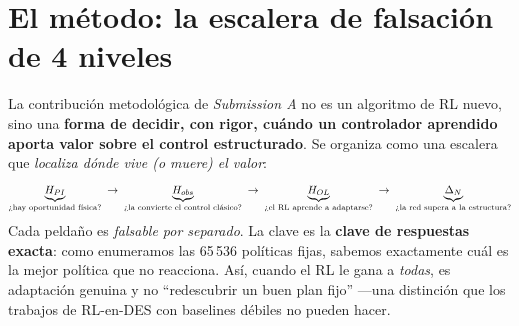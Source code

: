 \documentclass[11pt,a4paper]{article}
\begin{document}
\section{El método: la escalera de falsación de 4 niveles}\label{sec:metodo}
La contribución metodológica de \emph{Submission A} no es un algoritmo de RL nuevo, sino una
\textbf{forma de decidir, con rigor, cuándo un controlador aprendido aporta valor sobre el control
estructurado}. Se organiza como una escalera que \emph{localiza dónde vive (o muere) el valor}:
\[
\underbrace{H_{PI}}_{\text{\textquestiondown{}hay oportunidad física?}}
\;\to\;
\underbrace{H_{obs}}_{\text{\textquestiondown{}la convierte el control clásico?}}
\;\to\;
\underbrace{H_{OL}}_{\text{\textquestiondown{}el RL aprende a adaptarse?}}
\;\to\;
\underbrace{\Delta_N}_{\text{\textquestiondown{}la red supera a la estructura?}}
\]
Cada peldaño es \emph{falsable por separado}. La clave es la \textbf{clave de respuestas exacta}: como
enumeramos las 65\,536 políticas fijas, sabemos exactamente cuál es la mejor política que no reacciona.
Así, cuando el RL le gana a \emph{todas}, es adaptación genuina y no ``redescubrir un buen plan fijo''
—una distinción que los trabajos de RL-en-DES con baselines débiles no pueden hacer.
\end{document}
